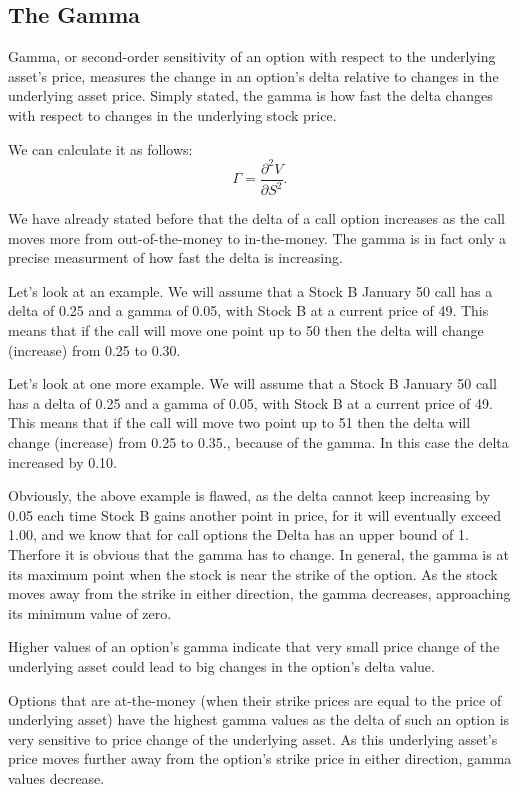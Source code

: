 \documentclass[a4paper, 12pt]{article}
\theoremstyle{definition}
\theoremstyle{plain}
\begin{document}
\subsection{The Gamma}

Gamma, or second-order sensitivity of an option 
with respect to the underlying asset's price, 
measures the change in an option's delta relative to changes 
in the underlying asset price. 
Simply stated, the gamma is how fast the delta changes with respect to changes in the
underlying stock price.

We can calculate it as follows:
$$
\Gamma = \frac{\partial^2 V}{\partial S^2}.
$$

We have already stated before that the delta of a call option 
increases as the call moves more from out-of-the-money to in-the-money.
The gamma is in fact only a precise measurment of how fast the delta is 
increasing.

Let's look at an example. We will assume that a Stock B January 50 call has a delta of 0.25
and a gamma of 0.05, with Stock B at a current price of 49. 
This means that if the call will move one point up to 50
then the delta will change (increase) from 0.25 to 0.30.

Let's look at one more example. We will assume that a Stock B January 50 call has a 
delta of 0.25 and a gamma of 0.05, with Stock B at a current price of 49. 
This means that if the call will move two point up to 51
then the delta will change (increase) from 0.25 to 0.35.,
because of the gamma.
In this case the delta increased by 0.10.

Obviously, the above example is flawed, as the
delta cannot keep increasing by 0.05 each time 
Stock B gains another point in price, for it will eventually exceed 1.00,
and we know that for call options the Delta has an upper bound of 1.
Therfore it is obvious that the gamma has to change.
In general, the gamma is at its maximum point when the stock is near the strike of the
option.
As the stock moves away from the strike in either direction, the gamma
decreases, approaching its minimum value of zero. 


Higher values of an option's gamma indicate that very small 
price change of the underlying asset could lead to 
big changes in the option's delta value.

Options that are at-the-money (when their strike prices 
are equal to the price of underlying asset) have the 
highest gamma values as the delta of such an option is 
very sensitive to price change of the underlying asset. 
As this underlying asset's price moves further away 
from the option's strike price in either direction, 
gamma values decrease. 
\end{document}
